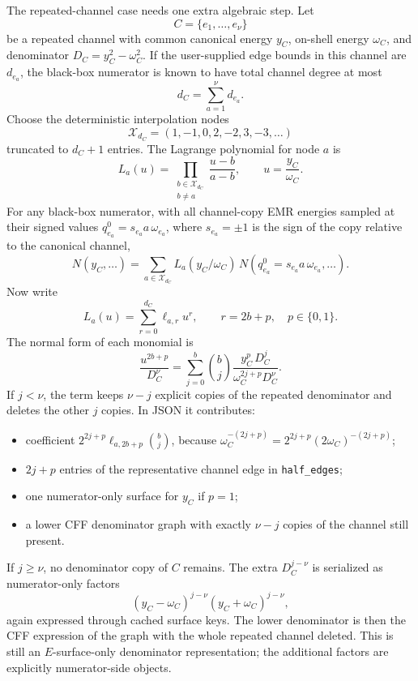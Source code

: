 \documentclass[11pt,a4paper]{report}
\newcommand{\Samples}{\mathcal X}
\begin{document}
The repeated-channel case needs one extra algebraic step.  Let
\[
  C=\{e_1,\ldots,e_\nu\}
\]
be a repeated channel with common canonical energy \(y_C\), on-shell energy
\(\omega_C\), and denominator \(D_C=y_C^2-\omega_C^2\).  If the user-supplied
edge bounds in this channel are \(d_{e_a}\), the black-box numerator is known
to have total channel degree at most
\[
  d_C=\sum_{a=1}^{\nu}d_{e_a}.
\]
Choose the deterministic interpolation nodes
\[
  \Samples_{d_C}=(1,-1,0,2,-2,3,-3,\ldots)
\]
truncated to \(d_C+1\) entries.  The Lagrange polynomial for node \(a\) is
\[
  L_a(u)=\prod_{\substack{b\in\Samples_{d_C}\\ b\ne a}}
  \frac{u-b}{a-b},\qquad u=\frac{y_C}{\omega_C}.
\]
For any black-box numerator, with all channel-copy EMR energies sampled at
their signed values \(q_{e_a}^0=s_{e_a}a\,\omega_{e_a}\), where
\(s_{e_a}=\pm1\) is the sign of the copy relative to the canonical channel,
\[
  N(y_C,\ldots)
  =
  \sum_{a\in\Samples_{d_C}}
  L_a(y_C/\omega_C)\,
  N\!\left(q_{e_a}^0=s_{e_a}a\,\omega_{e_a},\ldots\right).
  \label{eq:channel-interpolation}
\]
Now write
\[
  L_a(u)=\sum_{r=0}^{d_C}\ell_{a,r}u^r,\qquad
  r=2b+p,\quad p\in\{0,1\}.
\]
The normal form of each monomial is
\begin{equation}
  \frac{u^{2b+p}}{D_C^\nu}
  =
  \sum_{j=0}^{b}
  \binom{b}{j}
  \frac{y_C^{p}\,D_C^j}
       {\omega_C^{2j+p}D_C^\nu}.
  \label{eq:channel-normal-form}
\end{equation}
If \(j<\nu\), the term keeps \(\nu-j\) explicit copies of the repeated
denominator and deletes the other \(j\) copies.  In JSON it contributes:
\begin{itemize}[leftmargin=2em]
  \item coefficient \(2^{2j+p}\ell_{a,2b+p}\binom{b}{j}\), because
        \(\omega_C^{-(2j+p)}=2^{2j+p}(2\omega_C)^{-(2j+p)}\);
  \item \(2j+p\) entries of the representative channel edge in
        \texttt{half\_edges};
  \item one numerator-only surface for \(y_C\) if \(p=1\);
  \item a lower CFF denominator graph with exactly \(\nu-j\) copies of the
        channel still present.
\end{itemize}
If \(j\ge\nu\), no denominator copy of \(C\) remains.  The extra
\(D_C^{j-\nu}\) is serialized as numerator-only factors
\[
  (y_C-\omega_C)^{j-\nu}(y_C+\omega_C)^{j-\nu},
\]
again expressed through cached surface keys.  The lower denominator is then the
CFF expression of the graph with the whole repeated channel deleted.  This is
still an \(E\)-surface-only denominator representation; the additional factors
are explicitly numerator-side objects.
\end{document}
